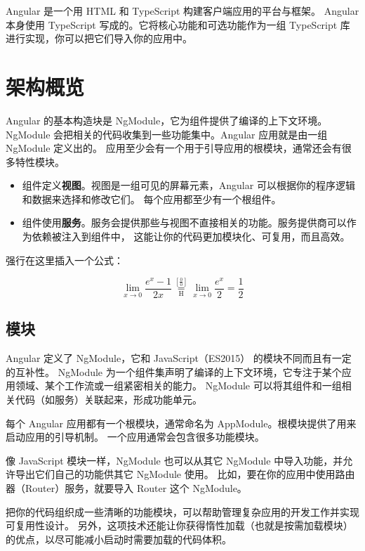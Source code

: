 \documentclass[a4paper,twoside]{ctexbook}
\begin{document}
Angular 是一个用 HTML 和 TypeScript 构建客户端应用的平台与框架。 Angular 本身使用 TypeScript 写成的。它将核心功能和可选功能作为一组 TypeScript 库进行实现，你可以把它们导入你的应用中。


\section{架构概览}

Angular 的基本构造块是 NgModule，它为组件提供了编译的上下文环境。 NgModule 会把相关的代码收集到一些功能集中。Angular 应用就是由一组 NgModule 定义出的。 应用至少会有一个用于引导应用的根模块，通常还会有很多特性模块。

\begin{itemize}
  \item 组件定义\textbf{视图}。视图是一组可见的屏幕元素，Angular 可以根据你的程序逻辑和数据来选择和修改它们。 每个应用都至少有一个根组件。
  \item 组件使用\textbf{服务}。服务会提供那些与视图不直接相关的功能。服务提供商可以作为依赖被注入到组件中， 这能让你的代码更加模块化、可复用，而且高效。
\end{itemize}

强行在这里插入一个公式：

\begin{equation}
  \label{eq:1}
   \lim_{x\to 0}{\frac{e^x-1}{2x}}
   \overset{\left[\frac{0}{0}\right]}{\underset{\mathrm{H}}{=}}
   \lim_{x\to 0}{\frac{e^x}{2}}={\frac{1}{2}}
\end{equation}


\subsection{模块}

Angular 定义了 NgModule，它和 JavaScript（ES2015） 的模块不同而且有一定的互补性。 NgModule 为一个组件集声明了编译的上下文环境，它专注于某个应用领域、某个工作流或一组紧密相关的能力。 NgModule 可以将其组件和一组相关代码（如服务）关联起来，形成功能单元。

每个 Angular 应用都有一个根模块，通常命名为 AppModule。根模块提供了用来启动应用的引导机制。 一个应用通常会包含很多功能模块。

像 JavaScript 模块一样，NgModule 也可以从其它 NgModule 中导入功能，并允许导出它们自己的功能供其它 NgModule 使用。 比如，要在你的应用中使用路由器（Router）服务，就要导入 Router 这个 NgModule。

把你的代码组织成一些清晰的功能模块，可以帮助管理复杂应用的开发工作并实现可复用性设计。 另外，这项技术还能让你获得惰性加载（也就是按需加载模块）的优点，以尽可能减小启动时需要加载的代码体积。
\end{document}
